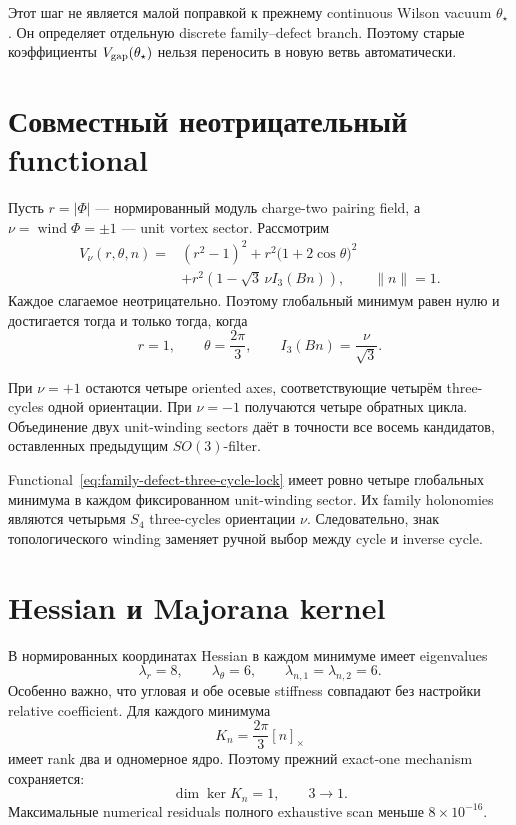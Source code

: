 Этот шаг не является малой поправкой к прежнему continuous Wilson vacuum
\(\theta_\star\). Он определяет отдельную discrete family--defect branch.
Поэтому старые коэффициенты \(V_{\rm gap}(\theta_\star)\) нельзя переносить
в новую ветвь автоматически.

\section{Совместный неотрицательный functional}

Пусть \(r=|\Phi|\) --- нормированный модуль charge-two pairing field, а
\(\nu=\operatorname{wind}\Phi=\pm1\) --- unit vortex sector. Рассмотрим
\begin{equation}
 \begin{split}
 V_\nu(r,\theta,n)={}&(r^2-1)^2
 +r^2\bigl(1+2\cos\theta\bigr)^2\\
 &+r^2\left(1-\sqrt3\,\nu I_3(Bn)\right),
 \qquad \|n\|=1.
 \end{split}
 \label{eq:family-defect-three-cycle-lock}
\end{equation}
Каждое слагаемое неотрицательно. Поэтому глобальный минимум равен нулю и
достигается тогда и только тогда, когда
\begin{equation}
 r=1,
 \qquad
 \theta=\frac{2\pi}{3},
 \qquad
 I_3(Bn)=\frac{\nu}{\sqrt3}.
\end{equation}

При \(\nu=+1\) остаются четыре oriented axes, соответствующие четырём
three-cycles одной ориентации. При \(\nu=-1\) получаются четыре обратных
цикла. Объединение двух unit-winding sectors даёт в точности все восемь
кандидатов, оставленных предыдущим \(SO(3)\)-filter.

\begin{theorem}
Functional~\eqref{eq:family-defect-three-cycle-lock} имеет ровно четыре
глобальных минимума в каждом фиксированном unit-winding sector. Их family
holonomies являются четырьмя \(S_4\) three-cycles ориентации \(\nu\).
Следовательно, знак топологического winding заменяет ручной выбор между
cycle и inverse cycle.
\end{theorem}

\section{Hessian и Majorana kernel}

В нормированных координатах Hessian в каждом минимуме имеет eigenvalues
\begin{equation}
 \lambda_r=8,
 \qquad
 \lambda_\theta=6,
 \qquad
 \lambda_{n,1}=\lambda_{n,2}=6.
\end{equation}
Особенно важно, что угловая и обе осевые stiffness совпадают без настройки
relative coefficient. Для каждого минимума
\begin{equation}
 K_n=\frac{2\pi}{3}[n]_\times
\end{equation}
имеет rank два и одномерное ядро. Поэтому прежний exact-one mechanism
сохраняется:
\begin{equation}
 \dim\ker K_n=1,
 \qquad
 3\longrightarrow1.
\end{equation}
Максимальные numerical residuals полного exhaustive scan меньше
\(8\times10^{-16}\).

